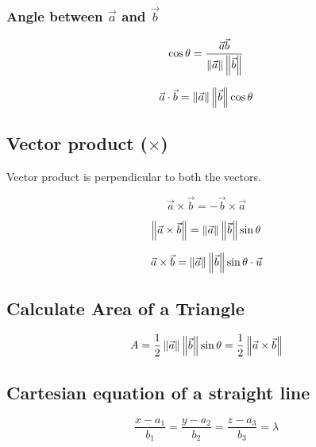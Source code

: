 \documentclass[a4paper,9pt]{scrartcl}
\begin{document}
    \subsubsection{Angle between $\vec{a}$ and $\vec{b}$}
    \begin{displaymath}
        \cos\theta = \frac{\vec{a}\vec{b}}{\left\| \vec{a} \right\|\left\| \vec{b} \right\|}
    \end{displaymath}

    \begin{displaymath}
        \vec{a}\cdot\vec{b} = \left\| \vec{a} \right\|\left\| \vec{b} \right\|\cos\theta
    \end{displaymath}

    \subsection{Vector product ($\times$)}
    Vector product is perpendicular to both the vectors.

    \begin{displaymath}
        \vec{a}\times\vec{b} = -\vec{b}\times\vec{a}
    \end{displaymath}

    \begin{displaymath}
        \left\| \vec{a}\times\vec{b} \right\| = \left\| \vec{a} \right\|\left\| \vec{b} \right\|\sin\theta
    \end{displaymath}

    \begin{displaymath}
        \vec{a}\times\vec{b} = \left\| \vec{a} \right\|\left\| \vec{b} \right\|\sin\theta\cdot\vec{u}
    \end{displaymath}

    \subsection{Calculate Area of a Triangle}
    \begin{displaymath}
        A = \frac{1}{2}\left\| \vec{a} \right\|\left\| \vec{b} \right\|\sin\theta = \frac{1}{2}\left\| \vec{a}\times\vec{b} \right\|
    \end{displaymath}

    \subsection{Cartesian equation of a straight line}
    \begin{displaymath}
        \frac{x - a_1}{b_1} = \frac{y - a_2}{b_2} = \frac{z - a_3}{b_3} = \lambda
    \end{displaymath}
\end{document}

